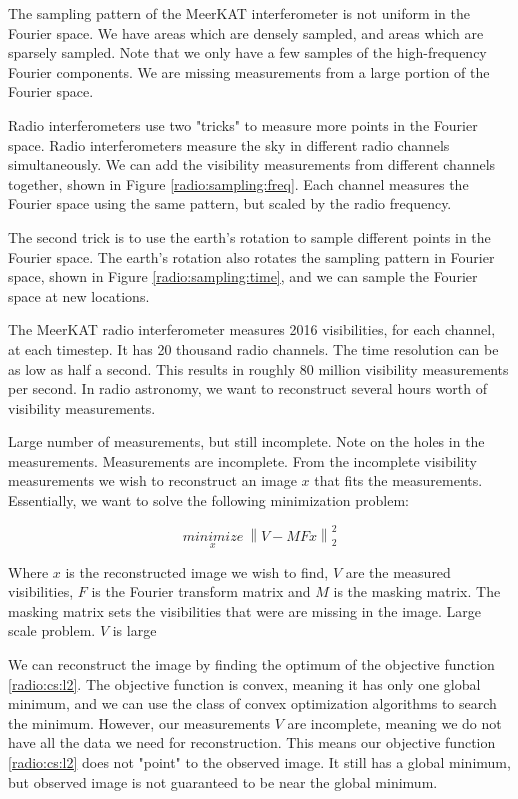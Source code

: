 The sampling pattern of the MeerKAT interferometer is not uniform in the Fourier space. We have areas which are densely sampled, and areas which are sparsely sampled. Note that we only have a few samples of the high-frequency Fourier components. We are missing measurements from a large portion of the Fourier space.

Radio interferometers use two "tricks" to measure more points in the Fourier space. Radio interferometers measure the sky in different radio channels simultaneously. We can add the visibility measurements from different channels together, shown in Figure \ref{radio:sampling:freq}. Each channel measures the Fourier space using the same pattern, but scaled by the radio frequency. 

The second trick is to use the earth's rotation to sample different points in the Fourier space. The earth's rotation also rotates the sampling pattern in Fourier space, shown in Figure \ref{radio:sampling:time}, and we can sample the Fourier space at new locations.

The MeerKAT radio interferometer measures 2016 visibilities, for each channel, at each timestep. It has 20 thousand radio channels. The time resolution can be as low as half a second. This results in roughly 80 million visibility measurements per second. In radio astronomy, we want to reconstruct several hours worth of visibility measurements.

Large number of measurements, but still incomplete.
Note on the holes in the measurements. Measurements are incomplete. From the incomplete visibility measurements we wish to reconstruct an image $x$ that fits the measurements. Essentially, we want to solve the following minimization problem: 

\begin{equation}\label{radio:cs:l2}
\underset{x}{minimize} \: \left \| V - MFx \right \|_2^2
\end{equation}

Where $x$ is the reconstructed image we wish to find, $V$ are the measured visibilities, $F$ is the Fourier transform matrix and $M$ is the masking matrix. The masking matrix sets the visibilities that were are missing in the image. 
Large scale problem. $V$ is large

We can reconstruct the image by finding the optimum of the objective function \eqref{radio:cs:l2}. The objective function is convex, meaning it has only one global minimum, and we can use the class of convex optimization algorithms to search the minimum. However, our measurements $V$ are incomplete, meaning we do not have all the data we need for reconstruction. This means our objective function \eqref{radio:cs:l2} does not "point" to the observed image. It still has a global minimum, but observed image is not guaranteed to be near the global minimum. 

